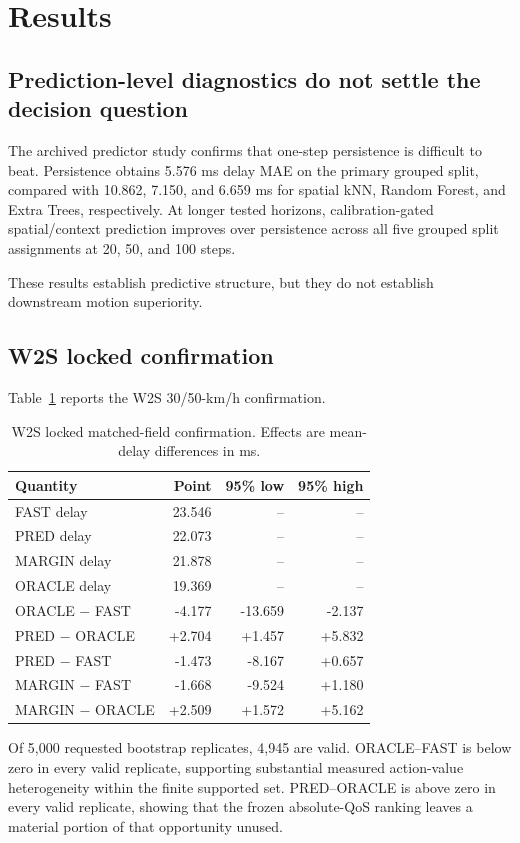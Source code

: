\documentclass[journal]{IEEEtran}
\begin{document}
\section{Results}
\subsection{Prediction-level diagnostics do not settle the decision question}
The archived predictor study confirms that one-step persistence is difficult to beat. Persistence obtains 5.576 ms delay MAE on the primary grouped split, compared with 10.862, 7.150, and 6.659 ms for spatial kNN, Random Forest, and Extra Trees, respectively. At longer tested horizons, calibration-gated spatial/context prediction improves over persistence across all five grouped split assignments at 20, 50, and 100 steps.

These results establish predictive structure, but they do not establish downstream motion superiority.

\subsection{W2S locked confirmation}
Table~\ref{tab:w2s} reports the W2S 30/50-km/h confirmation.

\begin{table}[t]
\caption{W2S locked matched-field confirmation. Effects are mean-delay differences in ms.}
\label{tab:w2s}
\centering
\small
\begin{tabular}{lrrr}
\toprule
Quantity & Point & 95\% low & 95\% high \\
\midrule
FAST delay & 23.546 & -- & -- \\
PRED delay & 22.073 & -- & -- \\
MARGIN delay & 21.878 & -- & -- \\
ORACLE delay & 19.369 & -- & -- \\
\midrule
ORACLE $-$ FAST & -4.177 & -13.659 & -2.137 \\
PRED $-$ ORACLE & +2.704 & +1.457 & +5.832 \\
PRED $-$ FAST & -1.473 & -8.167 & +0.657 \\
MARGIN $-$ FAST & -1.668 & -9.524 & +1.180 \\
MARGIN $-$ ORACLE & +2.509 & +1.572 & +5.162 \\
\bottomrule
\end{tabular}
\end{table}

Of 5,000 requested bootstrap replicates, 4,945 are valid. ORACLE--FAST is below zero in every valid replicate, supporting substantial measured action-value heterogeneity within the finite supported set. PRED--ORACLE is above zero in every valid replicate, showing that the frozen absolute-QoS ranking leaves a material portion of that opportunity unused.
\end{document}
